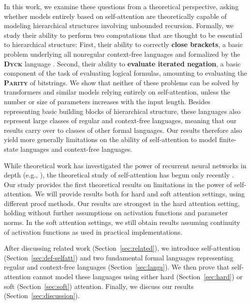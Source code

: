 \documentclass[11pt,a4paper]{article}
\newcommand{\key}[1]{\textbf{#1}}
\begin{document}
In this work, we examine these questions from a theoretical perspective, asking whether models entirely based on self-attention are theoretically capable of modeling hierarchical structures involving unbounded recursion.
Formally, we study their ability to perform two computations that are thought to be essential to hierarchical structure:
First, their ability to correctly \key{close brackets}, a basic problem underlying all nonregular context-free languages and formalized by the \key{\textsc{Dyck}} language \cite{chomsky1963algebraic}.
Second, their ability to \key{evaluate iterated negation}, a basic component of the task of evaluating logical formulas, amounting to evaluating the \key{\textsc{Parity}} of bitstrings.
We show that neither of these problems can be solved by transformers and similar models relying entirely on self-attention, unless the number or size of parameters increases with the input length.
Besides representing basic building blocks of hierarchical structure, these languages also represent large classes of regular and context-free languages, meaning that our results carry over to classes of other formal languages.
Our results therefore also yield more generally limitations on the ability of self-attention to model finite-state languages and context-free languages.

While theoretical work has investigated the power of recurrent neural networks in depth (e.g., \citet{siegelman1991neural, bengio1994learning, weiss2018practical, miller2018recurrent, merrill2019sequential}), the theoretical study of self-attention has begun only recently \citep{perez2019turing,hsieh2019robustness}.
Our study provides the first theoretical results on limitations in the power of self-attention.
We will provide results both for hard and soft attention settings, using different proof methods.
Our results are strongest in the hard attention setting, holding without further assumptions on activation functions and parameter norms.
In the soft attention settings, we still obtain results assuming continuity of activation functions as used in practical implementations.

After discussing related work (Section~\ref{sec:related}), we introduce self-attention (Section~\ref{sec:def-selfatt}) and two fundamental formal languages representing regular and context-free languages (Section~\ref{sec:langs}).
We then prove that self-attention cannot model these languages using either hard (Section~\ref{sec:hard}) or soft (Section~\ref{sec:soft}) attention.
Finally, we discuss our results (Section~\ref{sec:discussion}).
\end{document}
